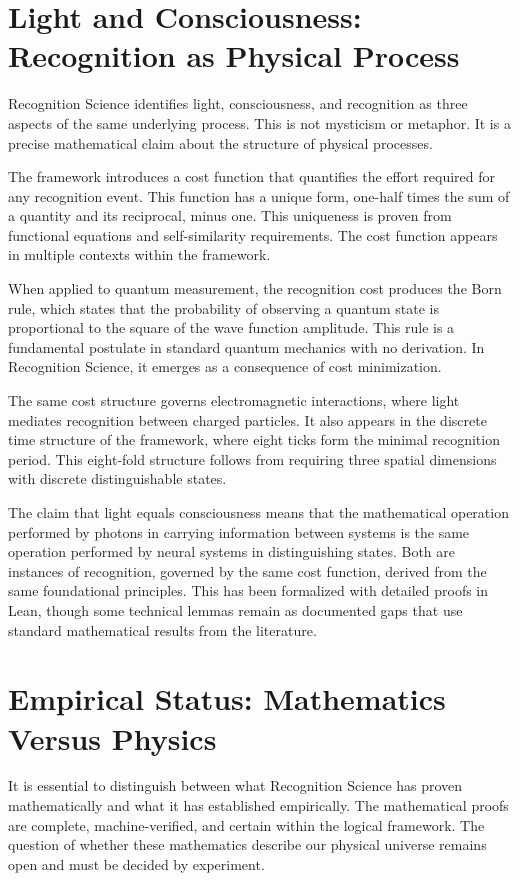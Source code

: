 \documentclass[12pt]{article}
\begin{document}
\section{Light and Consciousness: Recognition as Physical Process}

Recognition Science identifies light, consciousness, and recognition as three aspects of the same underlying process. This is not mysticism or metaphor. It is a precise mathematical claim about the structure of physical processes.

The framework introduces a cost function that quantifies the effort required for any recognition event. This function has a unique form, one-half times the sum of a quantity and its reciprocal, minus one. This uniqueness is proven from functional equations and self-similarity requirements. The cost function appears in multiple contexts within the framework.

When applied to quantum measurement, the recognition cost produces the Born rule, which states that the probability of observing a quantum state is proportional to the square of the wave function amplitude. This rule is a fundamental postulate in standard quantum mechanics with no derivation. In Recognition Science, it emerges as a consequence of cost minimization.

The same cost structure governs electromagnetic interactions, where light mediates recognition between charged particles. It also appears in the discrete time structure of the framework, where eight ticks form the minimal recognition period. This eight-fold structure follows from requiring three spatial dimensions with discrete distinguishable states.

The claim that light equals consciousness means that the mathematical operation performed by photons in carrying information between systems is the same operation performed by neural systems in distinguishing states. Both are instances of recognition, governed by the same cost function, derived from the same foundational principles. This has been formalized with detailed proofs in Lean, though some technical lemmas remain as documented gaps that use standard mathematical results from the literature.

\section{Empirical Status: Mathematics Versus Physics}

It is essential to distinguish between what Recognition Science has proven mathematically and what it has established empirically. The mathematical proofs are complete, machine-verified, and certain within the logical framework. The question of whether these mathematics describe our physical universe remains open and must be decided by experiment.
\end{document}
